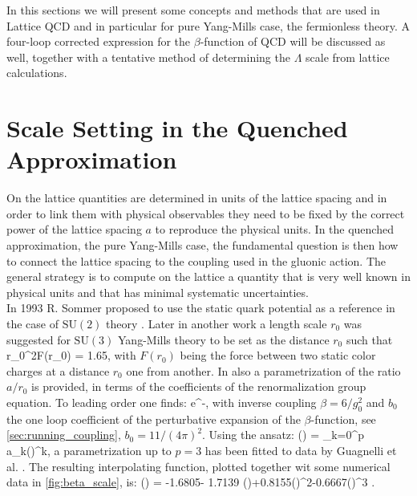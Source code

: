 In this sections we will present some concepts and methods that are used in Lattice QCD and in particular for pure Yang-Mills case, the fermionless theory. A four-loop corrected expression for the $\beta$-function of QCD will be discussed as well, together with a tentative method of determining the $\Lambda$ scale from lattice calculations.

\section{Scale Setting in the Quenched Approximation}
\label{sec:sommer}
On the lattice quantities are determined in units of the lattice spacing and in order to link them with physical observables they need to be fixed by the correct power of the lattice spacing $a$ to reproduce the physical units. In the quenched approximation, the pure Yang-Mills case, the fundamental question is then how to connect the lattice spacing to the coupling used in the gluonic action. The general strategy is to compute on the lattice a quantity that is very well known in physical units and that has minimal systematic uncertainties.\\ 
In 1993 R. Sommer proposed to use the static quark potential as a reference in the case of $\mathrm{SU}(2)$ theory \cite{sommer_new_1994}. Later in another work \cite{guagnelli_precision_1998} a length scale $r_0$ was suggested for $\mathrm{SU}(3)$ Yang-Mills theory to be set as the distance $r_0$ such that 
\beq
r_0^2F(r_0) = 1.65,
\eeq 
with $F(r_0)$ being the force between two static color charges at a distance $r_0$ one from another. In \cite{guagnelli_precision_1998} also a parametrization of the ratio $a/r_0$ is provided, in terms of the coefficients of the renormalization group equation. To leading order one finds:
\beq
     \propto e^{-},
\eeq
with inverse coupling $\beta = 6/g_0^2$ and $b_0$ the one loop coefficient of the perturbative expansion of the $\beta$-function, see \cref{sec:running_coupling}, $b_0=11/(4\pi)^2$. Using the ansatz:
\beq
    \ln\left(\right) = \sum_{k=0}^p a_k()^k,
\eeq
a parametrization up to $p=3$ has been fitted to data by Guagnelli et al. \cite{guagnelli_precision_1998}. The resulting interpolating function, plotted together wit some numerical data in \cref{fig:beta_scale}, is:
\beq
    \ln\left(\right) = -1.6805- 1.7139 ()+0.8155()^2-0.6667()^3
    \label{scale:parameter}.
\eeq

 
